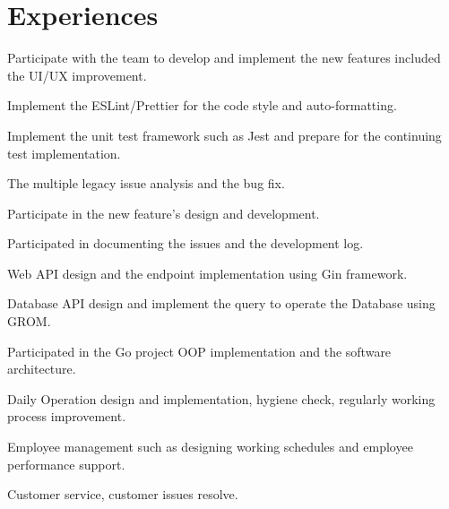 \section{Experiences}

\begin{resume_list}
\vspace{0.5em}
\item Participate with the team to develop and implement the new features included the UI/UX improvement.
\item Implement the ESLint/Prettier for the code style and auto-formatting.
\item Implement the unit test framework such as Jest and prepare for the continuing test implementation.
\vspace{0.5em}
\item The multiple legacy issue analysis and the bug fix.
\item Participate in the new feature's design and development.
\item Participated in documenting the issues and the development log.
\vspace{0.5em}
\item Web API design and the endpoint implementation using Gin framework.
\item Database API design and implement the query to operate the Database using GROM. 
\item Participated in the Go project OOP implementation and the software architecture.
\end{resume_list}

\vspace{1.5em}
\begin{resume_list}
\item Daily Operation design and implementation, hygiene check, regularly working process improvement.
\item Employee management such as designing working schedules and employee performance support.
\item Customer service, customer issues resolve.
\end{resume_list}

